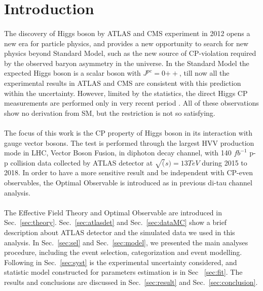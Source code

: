 \section{Introduction}
\label{sec:intro}


\paragraph{}The discovery of Higgs boson by ATLAS and CMS experiment in 2012 opens a new era for particle physics, and provides a new opportunity to search for new physics beyond Standard Model, such as the new source of CP-violation required by the observed baryon asymmetry in the universe. In the Standard Model the expected Higgs boson is a scalar boson with $J^{pc} = 0{++}$, till now all the experimental results in ATLAS and CMS are consistent with this prediction within the uncertainty.  However, limited by the statistics, the direct Higgs CP measurements are performed only in very recent period  \cite{VBFHtautau}\cite{ttHyy}\cite{CMS_VBFHtautau}\cite{CMS_ttHyy}. All of these observations show no derivation from SM, but the restriction is not so satisfying. 


\paragraph{} The focus of this work is the CP property of Higgs boson in its interaction with gauge vector bosons. The test is performed through the largest HVV production mode in LHC, Vector Boson Fusion, in diphoton decay channel, with 140 $fb^{-1}$ p-p collision data collected by ATLAS detector at $\sqrt(s)=13TeV$ during 2015 to 2018. In order to have a more sensitive result and be independent with CP-even observables, the Optimal Observable is introduced as in previous di-tau channel analysis. 



\paragraph{}The Effective Field Theory and Optimal Observable are introduced in Sec.~\ref{sec:theory}. Sec.~\ref{sec:atlasdet} and Sec.~\ref{sec:dataMC} show a brief description about ATLAS detector and the simulated data we used in this analysis. In Sec.~\ref{sec:sel} and Sec.~\ref{sec:model}, we presented the main analyses procedure, including the event selection, categorization and event modelling. Following in Sec.~\ref{sec:syst} is the experimental uncertainty considered, and statistic model constructed for parameters estimation is in Sec ~\ref{sec:fit}. The results and conclusions are discussed in Sec.~\ref{sec:result} and Sec.~\ref{sec:conclusion}.  

